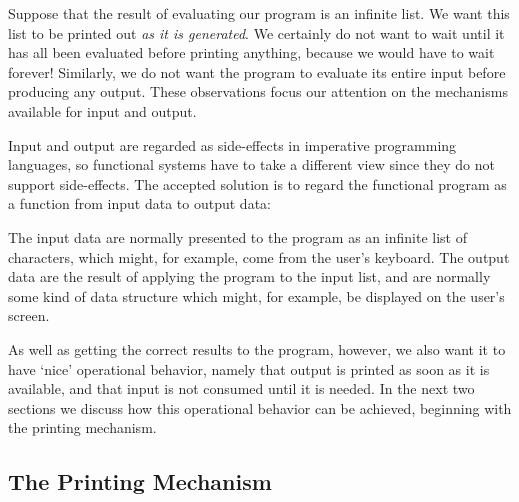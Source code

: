 Suppose that the result of evaluating our program is an infinite list. We want
this list to be printed out \textit{as it is generated}. We certainly do not want to wait
until it has all been evaluated before printing anything, because we would
have to wait forever! Similarly, we do not want the program to evaluate its
entire input before producing any output. These observations focus our
attention on the mechanisms available for input and output.

Input and output are regarded as side-effects in imperative programming
languages, so functional systems have to take a different view since they do
not support side-effects. The accepted solution is to regard the functional
program as a function from input data to output data:
\begin{center}
\end{center}
The input data are normally presented to the program as an infinite list of
characters, which might, for example, come from the user’s keyboard. The
output data are the result of applying the program to the input list, and are
normally some kind of data structure which might, for example, be displayed
on the user’s screen.

As well as getting the correct results to the program, however, we also want
it to have `nice’ operational behavior, namely that output is printed as soon as
it is available, and that input is not consumed until it is needed. In the next two
sections we discuss how this operational behavior can be achieved, beginning
with the printing mechanism.

\subsection{The Printing Mechanism}

